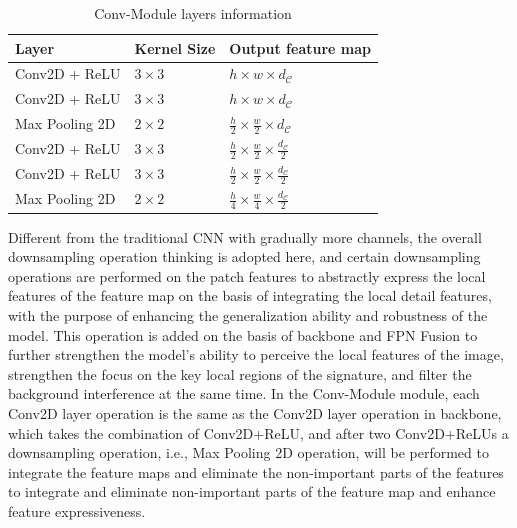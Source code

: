 \begin{table}[htbp]
\caption{Conv-Module layers information}  
\begin{center}
\begin{tabu} to 0.8\textwidth{X[3, c]X[3, c]X[3, c]}  
\toprule
Layer & Kernel Size & Output feature map\\
\midrule
Conv2D + ReLU & $3\times 3$ & $h\times w\times d_\mathcal{C}$ \\ 
Conv2D + ReLU & $3\times 3$ & $h\times w\times d_\mathcal{C}$ \\ 
Max Pooling 2D & $2\times 2$ & $\frac{h}{2}\times \frac{w}{2}\times d_\mathcal{C}$ \\ 
Conv2D + ReLU & $3\times 3$ & $\frac{h}{2}\times \frac{w}{2}\times \frac{d_\mathcal{C}}{2}$ \\ 
Conv2D + ReLU & $3\times 3$ & $\frac{h}{2}\times \frac{w}{2}\times \frac{d_\mathcal{C}}{2}$ \\ 
Max Pooling 2D & $2\times 2$ & $\frac{h}{4}\times \frac{w}{4}\times \frac{d_\mathcal{C}}{2}$ \\ 
\bottomrule
\end{tabu}
\end{center}
\label{tab:conv}
\end{table}

Different from the traditional CNN with gradually more channels, the overall downsampling operation thinking is adopted here, and certain downsampling operations are performed on the patch features to abstractly express the local features of the feature map on the basis of integrating the local detail features, with the purpose of enhancing the generalization ability and robustness of the model. This operation is added on the basis of backbone and FPN Fusion to further strengthen the model's ability to perceive the local features of the image, strengthen the focus on the key local regions of the signature, and filter the background interference at the same time. In the Conv-Module module, each Conv2D layer operation is the same as the Conv2D layer operation in backbone, which takes the combination of Conv2D+ReLU, and after two Conv2D+ReLUs a downsampling operation, i.e., Max Pooling 2D operation, will be performed to integrate the feature maps and eliminate the non-important parts of the features to integrate and eliminate non-important parts of the feature map and enhance feature expressiveness.

